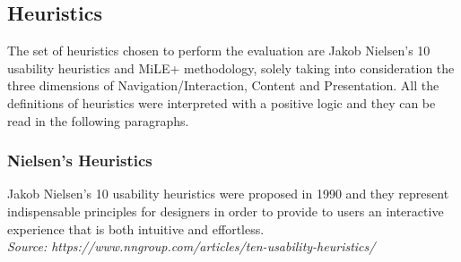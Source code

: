 
\subsection{Heuristics}
The set of heuristics chosen to perform the evaluation are Jakob Nielsen's 10 usability heuristics and MiLE+ methodology, solely taking into consideration the three dimensions of Navigation/Interaction, Content and Presentation. All the definitions of heuristics were interpreted with a positive logic and they can be read in the following paragraphs.

\subsubsection{Nielsen’s Heuristics}
Jakob Nielsen’s 10 usability heuristics were proposed in 1990 and they represent indispensable principles for designers in order to provide to users an interactive experience that is both intuitive and effortless.\\
\textit{Source: https://www.nngroup.com/articles/ten-usability-heuristics/}\\

